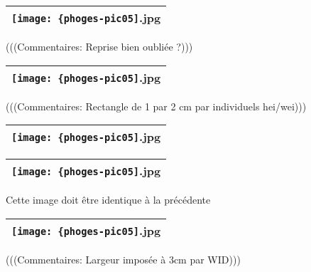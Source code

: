 \documentclass[12pt,twocolumn,french]{article}
\begin{document}
  \begin{figure}[H]
    \caption{
      (((Commentaires: Reprise bien oubliée ?)))
    }
    \vspace{4mm}
    \label{phoges-pic05.jpg}
    \noindent \centering{}
    \begin{tabular}{|c|}
      \hline
          \texttt{[image: \{phoges-pic05]}.jpg}
        \tabularnewline \hline
    \end{tabular}
  \end{figure}
  \begin{figure}[H]
    \caption{
      (((Commentaires: Rectangle de 1 par 2 cm par individuels hei/wei)))
    }
    \vspace{4mm}
    \label{phoges-pic05.jpg}
    \noindent \centering{}
    \begin{tabular}{|c|}
      \hline
          \texttt{[image: \{phoges-pic05]}.jpg}
        \tabularnewline \hline
    \end{tabular}
  \end{figure}
  \begin{figure}[H]
    \caption{
    }
    \vspace{4mm}
    \label{phoges-pic05.jpg}
    \noindent \centering{}
    \begin{tabular}{|c|}
      \hline
          \texttt{[image: \{phoges-pic05]}.jpg}
        \tabularnewline \hline
    \end{tabular}
  \end{figure}

  \begin{figure}[H]
    \caption{
      Cette image doit être identique à la précédente
    }
    \vspace{4mm}
    \label{phoges-pic05.jpg}
    \noindent \centering{}
    \begin{tabular}{|c|}
      \hline
          \texttt{[image: \{phoges-pic05]}.jpg}
        \tabularnewline \hline
    \end{tabular}
  \end{figure}

  \begin{figure}[H]
    \caption{
      (((Commentaires: Largeur imposée à 3cm par WID)))
    }
    \vspace{4mm}
    \label{phoges-pic05.jpg}
    \noindent \centering{}
    \begin{tabular}{|c|}
      \hline
          \texttt{[image: \{phoges-pic05]}.jpg}
        \tabularnewline \hline
    \end{tabular}
  \end{figure}
%
\end{document}
